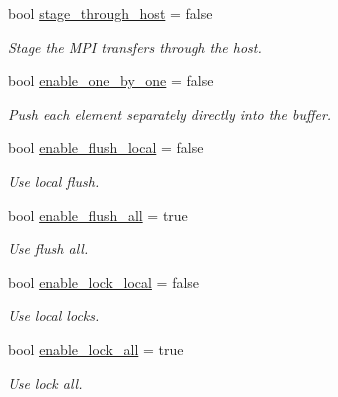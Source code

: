 \begin{DoxyCompactItemize}
bool \hyperlink{structschwz_1_1Settings_1_1comm__settings_aa4b8ae4d62df13f3376663d4c2cd28d5}{stage\+\_\+through\+\_\+host} = false
\begin{DoxyCompactList}\small\item\em Stage the M\+PI transfers through the host. \end{DoxyCompactList}\item 
\mbox{\label{structschwz_1_1Settings_1_1comm__settings_aae063b9fcf2bc8e49e960286e4c0939f}} 
bool \hyperlink{structschwz_1_1Settings_1_1comm__settings_aae063b9fcf2bc8e49e960286e4c0939f}{enable\+\_\+one\+\_\+by\+\_\+one} = false
\begin{DoxyCompactList}\small\item\em Push each element separately directly into the buffer. \end{DoxyCompactList}\item 
\mbox{\label{structschwz_1_1Settings_1_1comm__settings_a5bea917e0dc11a5a671bd4d8cdb3e3cf}} 
bool \hyperlink{structschwz_1_1Settings_1_1comm__settings_a5bea917e0dc11a5a671bd4d8cdb3e3cf}{enable\+\_\+flush\+\_\+local} = false
\begin{DoxyCompactList}\small\item\em Use local flush. \end{DoxyCompactList}\item 
\mbox{\label{structschwz_1_1Settings_1_1comm__settings_a3eb62d22f79472020fce577ceddad916}} 
bool \hyperlink{structschwz_1_1Settings_1_1comm__settings_a3eb62d22f79472020fce577ceddad916}{enable\+\_\+flush\+\_\+all} = true
\begin{DoxyCompactList}\small\item\em Use flush all. \end{DoxyCompactList}\item 
\mbox{\label{structschwz_1_1Settings_1_1comm__settings_abc715396bf51f36307caf88db02c819c}} 
bool \hyperlink{structschwz_1_1Settings_1_1comm__settings_abc715396bf51f36307caf88db02c819c}{enable\+\_\+lock\+\_\+local} = false
\begin{DoxyCompactList}\small\item\em Use local locks. \end{DoxyCompactList}\item 
\mbox{\label{structschwz_1_1Settings_1_1comm__settings_a39a59cea325ea1b57aba12e9ada4b91b}} 
bool \hyperlink{structschwz_1_1Settings_1_1comm__settings_a39a59cea325ea1b57aba12e9ada4b91b}{enable\+\_\+lock\+\_\+all} = true
\begin{DoxyCompactList}\small\item\em Use lock all. \end{DoxyCompactList}\end{DoxyCompactItemize}


